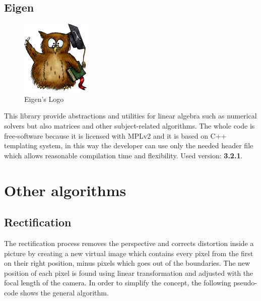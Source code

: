 \subsection{Eigen}
\begin{figure}[hbt]
    \centering
    \caption{Eigen's Logo}
    \includegraphics{img/eigen.png}
\end{figure}
This library provide abstractions and utilities for linear algebra such as numerical solvers but also matrices and other subject-related algorithms.
The whole code is free-software because it is licensed with MPLv2 and it is based on C++ templating system, in this way the developer can use only the needed header file which allows reasonable compilation time and flexibility.\cite{eigeninfo}
\newline Used version: \textbf{3.2.1}.

\section{Other algorithms}

\subsection{Rectification}
The rectification process removes the perspective and corrects distortion inside a picture by creating a new virtual image which contains every pixel from the first on their right position, minus pixels which goes out of the boundaries.
The new position of each pixel is found using linear transformation and adjusted with the focal length of the camera.
In order to simplify the concept, the following pseudo-code shows the general algorithm.

